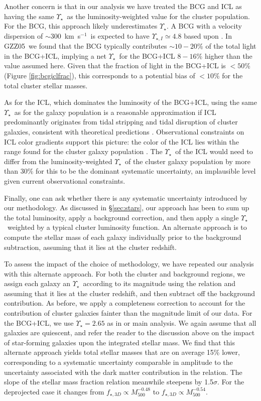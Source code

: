 \documentclass[preprint]{emulateapj}
\newcommand{\kms}{~km~s$^{-1}$}
\newcommand\pone{GZZ05}
\newcommand{\mlrat}{$\Upsilon_\star$}
\newcommand{\mlrati}{$\Upsilon_{\star,I}$}
\begin{document}
Another concern is that in our analysis we have treated the BCG and
ICL as having the same \mlrat\ as the luminosity-weighted value for
the cluster population.  For the BCG, this approach likely
underestimates \mlrat. A BCG with a velocity dispersion of
$\sim300$\kms\ is expected to have \mlrati$\simeq4.8$ based upon
\citet{cappellari2006}.  In \pone\ we found that the BCG typically
contributes $\sim10-20$\% of the total light in the BCG+ICL, implying
a net \mlrat\ for the BCG+ICL $8-16$\% higher than the value assumed
here. Given that the fraction of light in the BCG+ICL is $<50$\%
(Figure \ref{fig:bcgiclfrac}), this corresponds to a potential bias of
$<10$\% for the total cluster stellar masses.

As for the ICL, which dominates the luminosity of the BCG+ICL, using
the same \mlrat\ as for the galaxy population is a reasonable
approximation if ICL predominantly originates from tidal stripping and
tidal disruption of cluster galaxies, consistent with theoretical
predictions
\citep{purcell2007,conroy2007,behroozi2012,watson2012,contini2013}.
Observational constraints on ICL color gradients support this picture:
the color of the ICL lies within the range found for the cluster
galaxy population \citep[][De Maio et al., in prep]{zibetti2005}.  The
\mlrat\ of the ICL would need to differ from the luminosity-weighted
\mlrat\ of the cluster galaxy population by more than 30\% for this to
be the dominant systematic uncertainty, an implausible level given
current observational constraints.

Finally, one can ask whether there is any systematic uncertainty
introduced by our methodology. As discussed in \S \ref{sec:stars}, our
approach has been to sum up the total luminosity, apply a background
correction, and then apply a single \mlrat\ weighted by a typical
cluster luminosity function.  An alternate approach is to compute the
stellar mass of each galaxy individually prior to the background
subtraction, assuming that it lies at the cluster redshift.

To assess the impact of the choice of methodology, we have repeated
our analysis with this alternate approach. For both the cluster and
background regions, we assign each galaxy an \mlrat\ according to its
magnitude using the \citet{cappellari2006} relation and assuming that
it lies at the cluster redshift, and then subtract off the background
contribution. As before, we apply a completeness correction to account
for the contribution of cluster galaxies fainter than the magnitude
limit of our data. For the BCG+ICL, we use \mlrat$=2.65$ as in or main
analysis. We again assume that all galaxies are quiescent, and refer
the reader to the discussion above on the impact of star-forming
galaxies upon the integrated stellar mass.  We find that this
alternate approach yields total stellar masses that are on average
15\% lower, corresponding to a systematic uncertainty comparable in
amplitude to the uncertainty associated with the dark matter
contribution in the \citet{cappellari2006} relation. The slope of the
stellar mass fraction relation meanwhile steepens by 1.5$\sigma$. For
the deprojected case it changes from $f_{\star,3D}\propto
M_{500}^{-0.48}$ to $f_{\star,3D}\propto M_{500}^{-0.54}$.
\end{document}
